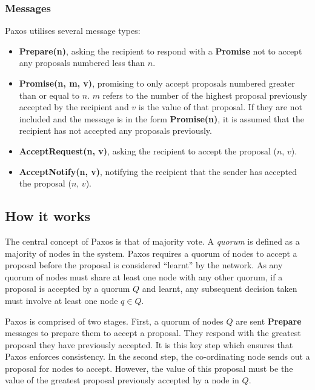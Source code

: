 \documentclass[12pt,twoside,notitlepage]{report}
\newcommand{\msg}[1] {{\bf #1}}         %
\begin{document}
\subsubsection*{Messages}

Paxos utilises several message types:

\begin{itemize}
\item \msg{Prepare(n)}, asking the recipient to respond with a \msg{Promise} not to
	accept any proposals numbered less than $n$.
\item \msg{Promise(n, m, v)}, promising to only accept proposals numbered greater than or equal to
	$n$. $m$ refers to the number of the highest proposal previously accepted by the recipient and
	$v$ is the value of that proposal. If they are not included and the message is in the form
	\msg{Promise(n)}, it is assumed that the recipient has not accepted any proposals
		previously.
\item \msg{AcceptRequest(n, v)}, asking the recipient to accept the proposal ($n$, $v$).
\item \msg{AcceptNotify(n, v)}, notifying the recipient that the sender has accepted the proposal
	($n$, $v$).
\end{itemize}

\subsection{How it works}

\label{sec:how-paxos-works}

The central concept of Paxos is that of majority vote. A \emph{quorum} is defined as a majority of
nodes in the system.  Paxos requires a quorum of nodes to accept a proposal before the proposal is
considered ``learnt'' by the network. As any quorum of nodes must share at least one node with any
other quorum, if a proposal is accepted by a quorum $Q$ and learnt, any subsequent decision taken
must involve at least one node $q \in Q$.

Paxos is comprised of two stages. First, a quorum of nodes $Q$ are sent \msg{Prepare} messages to
prepare them to accept a proposal. They respond with the greatest proposal they have previously
accepted. It is this key step which ensures that Paxos enforces consistency. In the second step,
the co-ordinating node sends out a proposal for nodes to accept. However, the value of this
proposal must be the value of the greatest proposal previously accepted by a node in $Q$.
\end{document}
